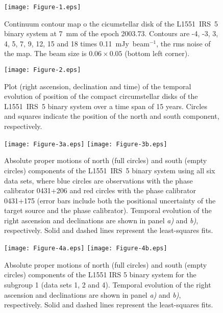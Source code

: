 \documentclass[debug]{rmaa}
\begin{document}
\begin{figure}[ht]
  \texttt{[image: Figure-1.eps]}  
 \caption{Continuum contour map o the cicumstellar disk of the  L1551~IRS~5 
 binary system at 7~mm of the epoch 2003.73. Contours are -4, -3, 3, 4, 5, 7, 9, 12, 15 
 and 18 times 0.11~mJy~beam$^{-1}$, the rms noise of the map. The beam size is 
 $0.06 \times 0.05$ (bottom left corner).  }
  \label{Map1}
\end{figure}


\begin{figure}[ht]
  \texttt{[image: Figure-2.eps]}  
 \caption{Plot (right ascension, declination and time) of the temporal evolution
 of position of the compact circumstellar disks of the L1551~IRS~5 binary system
 over a time span of 15 years. 
 Circles and squares indicate the position of the north and south component, respectively.  }
  \label{Fig-3D}
\end{figure}


\begin{figure*}[ht]
 \texttt{[image: Figure-3a.eps]} 
 \hfill
  \texttt{[image: Figure-3b.eps]}
   \caption{Absolute proper motions of north (full circles) and south (empty circles)
   components of the L1551~IRS~5 binary system using all six data sets,
   where blue circles are observations with the phase calibrator 0431+206 and red
   circles with the phase calibrator 0431+175 (error bars include both the positional
   uncertainty of the target source and the phase calibrator).
   Temporal evolution of the right ascension and declinations are shown in panel {\it a)} 
   and {\it b)}, respectively.  Solid and dashed lines represent the least-squares fits.
    }
  \label{Mov-Abs}
\end{figure*}


\begin{figure*}[ht]
 \texttt{[image: Figure-4a.eps]} 
 \hfill
  \texttt{[image: Figure-4b.eps]}
   \caption{Absolute proper motions of north (full circles) and south (empty circles)
     components of the L1551 IRS 5 binary system for the subgroup 1 (data sets 1, 2 and 4).  
     Temporal evolution of the right ascension and declinations are shown in panel {\it a)} 
   and {\it b)}, respectively.  Solid and dashed lines represent the least-squares fits. }
  \label{Set-1}
\end{figure*}
\end{document}
